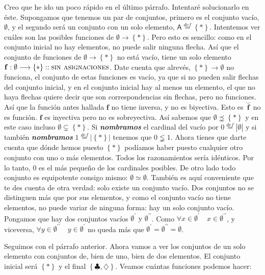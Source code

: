 \documentclass{amsart}
\theoremstyle{definition}
\theoremstyle{remark}
\numberwithin{equation}{section}
\newcommand{\abs}[1]{\left\lvert#1\right\rvert}
\newcommand{\set}[1]{\left\lbrace{#1}\right\rbrace}
\newcommand{\fromto}{\longrightarrow}
\newcommand{\setsymbol}[1]{\textsf{#1}}
\newcommand{\sA}{\setsymbol{A}}
\newcommand{\card}[1]{\abs{#1}}
\newcommand{\monrel}[1]{\mathbf{#1}}
\newcommand{\monrelinv}[1]{\overset{\smallsmile}{\monrel{#1}}}
\newcommand{\funct}[1]{\monrel{#1}}
\newcommand{\defin}{\overset {def}{=}}
\begin{document}
	Creo que he ido un poco rápido en el último párrafo. Intentaré 
solucionarlo en éste. Supongamos que tenemos un par de conjuntos, primero es 
el conjunto vacío, $ \emptyset $, y el segundo será un conjunto con un solo 
elemento, $ \sA \defin \set{*} $. Intentemos ver cuáles son las posibles 
funciones de $ \emptyset \fromto \set{*} $. Pero esto es sencillo: como en el 
conjunto inicial no hay elementos, no puede salir ninguna flecha. Así que el 
conjunto de funciones de $ \emptyset \fromto \set{*} $ no está vacío, tiene 
un solo elemento $\funct{f} : \emptyset \fromto \set{*} :: \textsc{sin 
asignaciones}$. Date cuenta que alrevés, $\set{*} \fromto \emptyset$ no 
funciona, el conjunto de estas funciones es vacío, ya que si no pueden salir 
flechas del conjunto inicial, y en el conjunto inicial hay al menos un 
elemento, el que no haya flechas quiere decir que son correspondencias sin 
flechas, pero no funciones. Así que la función antes hallada $\funct{f}$ no 
tiene inversa, y no es biyectiva. Esto es $\monrelinv{f}$ no es función. 
$\funct{f}$ es inyectiva pero no es sobreyectiva. Así sabemos que $\emptyset 
\precnsim \set{*}$ y en este caso incluso $\emptyset \subsetneq \set{*}$. Si 
\textbf{\emph{nombramos}} el cardinal del vacío por $0 \defin 
\card{\emptyset}$ y si también \textbf{\emph{nombramos}} $1 \defin 
\card{\set{*}}$ tenemos que $0 \lneqq 1$. Ahora tienes que darte cuenta que 
dónde hemos puesto $\set{*}$ podíamos haber puesto cualquier otro conjunto 
con uno o más elementos. Todos los razonamientos sería idénticos. Por lo 
tanto, $0$ es el más pequeño de los cardinales posibles. De otro lado todo 
conjunto es equipotente consigo mismo: $\emptyset \simeq \emptyset$. También 
es aquí conveniente que te des cuenta de otra verdad: solo existe un conjunto 
vacío. Dos conjuntos no se distinguen más que por sus elementos, y como el 
conjunto vacío no tiene elementos, no puede variar de ninguna forma: hay un 
solo conjunto vacío. Pongamos que hay dos conjuntos vacíos 
$\emptyset^\prime\text{ y }\emptyset^{\prime\prime}$. Como $\forall x \in 
\emptyset^\prime\quad x \in \emptyset^{\prime\prime}$, y viceversa, $\forall 
y \in \emptyset^{\prime\prime}\quad y \in \emptyset^\prime$ no queda más que 
$\emptyset^\prime = \emptyset^{\prime\prime} = \emptyset$.


	Seguimos con el párrafo anterior. Ahora vamos a ver los conjuntos de un 
solo elemento con conjuntos de, bien de uno, bien de dos elementos. El 
conjunto inicial será $\set{*}$ y el final $\set{\clubsuit,\diamondsuit}$. 
Veamos cuántas funciones podemos hacer:
\end{document}
